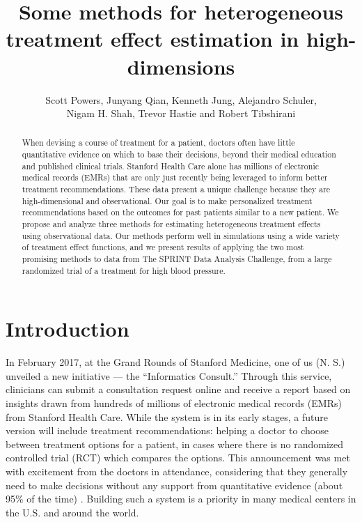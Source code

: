 \documentclass{article}
\title{Some methods for heterogeneous treatment effect estimation in 
  high-dimensions}
\author{Scott Powers, Junyang Qian, Kenneth Jung, Alejandro Schuler,\\
  Nigam H. Shah, Trevor Hastie and Robert Tibshirani}
\begin{document}
\maketitle

\begin{abstract}
When devising a course of treatment for a patient, doctors often have little
quantitative evidence on which to base their decisions, beyond their medical
education and published clinical trials. Stanford Health Care alone has
millions of electronic medical records (EMRs) that are only just recently being
leveraged to inform better treatment recommendations. These data present a
unique challenge because they are high-dimensional and observational. Our goal
is to make personalized treatment recommendations based on the outcomes for
past patients similar to a new patient. We propose and analyze three methods
for estimating heterogeneous treatment effects using observational data.
Our methods perform well in simulations using a wide variety of treatment
effect functions, and we present results of applying the two most promising
methods to data from The SPRINT Data Analysis Challenge, from a large
randomized trial of a treatment for high blood pressure.
\end{abstract}

\section{Introduction}
\label{sec-intro}

In February 2017, at the Grand Rounds of Stanford Medicine, one of us (N. S.)
unveiled a new initiative --- the ``Informatics Consult.'' Through this service,
clinicians can submit a consultation request online and receive a report based
on insights drawn from hundreds of millions of electronic medical records
(EMRs) from
Stanford Health Care. While the system is in its early stages, a future version
will include treatment recommendations: helping a doctor to choose between
treatment options for a patient, in cases where there is no
randomized controlled trial (RCT) which compares the options. 
This announcement was met with excitement from the
doctors in attendance, considering that they generally need to make decisions
without any support from quantitative evidence (about 95\% of the time)
\citep{Shah16}. Building such a system is a priority in many medical
centers in the U.S. and around the world.
\end{document}

